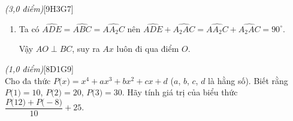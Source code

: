 \begin{ex}{\it{(3,0 điểm)}}[9H3G7]
{\begin{enumerate}
Gọi $H=BD\cap CE$ ta có $CH\perp AB$ và $BA_2\perp AB$ nên $CH\parallel BA_2.$ 

Tương tự $BH\parallel CA_2$ nên $BHCA_2$ là hình bình hành. 

Suy ra $S_{A_2BC}=S_{HBC}.$
Ta được $\dfrac{A_1A_2}{A_1A}=\dfrac{S_{HBC}}{S_{ABC}}.$

Vậy $\dfrac{A_1A_2}{A_1A}+\dfrac{B_1B_2}{B_1B}+\dfrac{C_1C_2}{C_1C}=\dfrac{S_{HBC}}{S_{ABC}}+\dfrac{S_{HCA}}{S_{ABC}}+\dfrac{S_{HAB}}{S_{ABC}}=\dfrac{S_{ABC}}{S_{ABC}}.$

\item Ta có $\widehat{ADE}=\widehat{ABC}=\widehat{AA_2C}$ nên $\widehat{ADE}+\widehat{A_2AC}=\widehat{AA_2C}+\widehat{A_2AC}=90^{\circ}.$

Vậy $AO\perp BC$, suy ra $Ax$ luôn đi qua điểm $O.$
\end{enumerate}
}
\end{ex}
\begin{ex}{\it{(1,0 điểm)}}[8D1G9]\\
Cho đa thức $P\big(x\big) = x^4 +  ax^3 + bx^2 + cx + d$ ($a$, $b$, $c$, $d$ là hằng số). Biết rằng $P\big(1\big) = 10$, $P\big(2\big) = 20$, $P\big(3\big) = 30$. Hãy tính giá trị của biểu thức $\dfrac{P\big(12\big) + P\big(- 8\big)}{10} + 25.$   
\end{ex}
